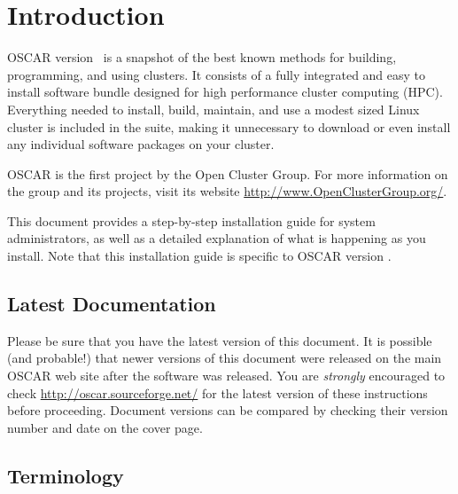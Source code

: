 %
%
%
%
%

\section{Introduction}
OSCAR version \oscarversion\ is a snapshot of the best known methods
for building, programming, and using clusters. It consists of a
fully integrated and easy to install software bundle designed for
high performance cluster computing (HPC). Everything needed to
install, build, maintain, and use a modest sized Linux cluster is
included in the suite, making it unnecessary to download or even
install any individual software packages on your cluster.

OSCAR is the first project by the Open Cluster Group. For more
information on the group and its projects, visit its website
\url{http://www.OpenClusterGroup.org/}.

This document provides a step-by-step installation guide for system
administrators, as well as a detailed explanation of what is
happening as you install.  Note that this installation guide is
specific to OSCAR version \oscarversion.


\subsection{Latest Documentation}

Please be sure that you have the latest version of this document.  It
is possible (and probable!) that newer versions of this document were
released on the main OSCAR web site after the software was released.
You are {\em strongly} encouraged to check
\url{http://oscar.sourceforge.net/} for the latest version of these
instructions before proceeding.  Document versions can be compared by
checking their version number and date on the cover page.


\subsection{Terminology}

